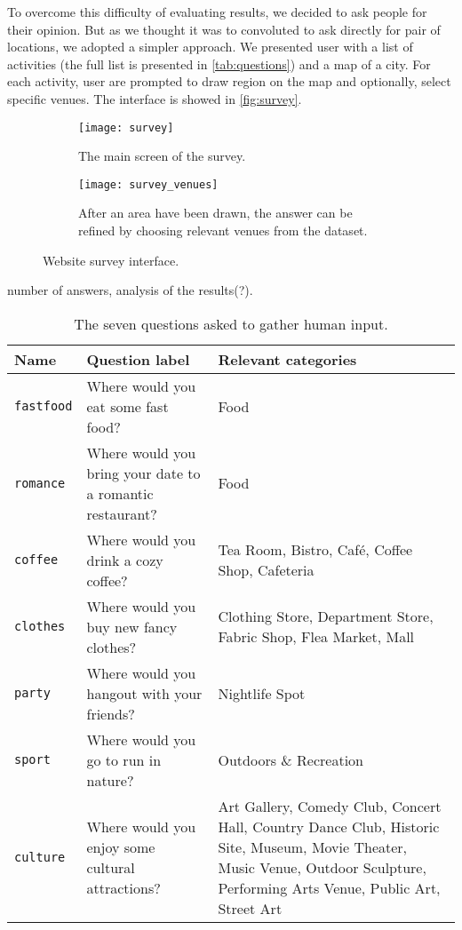To overcome this difficulty of evaluating results, we decided to ask people
for their opinion. But as we thought it was to convoluted to ask directly for
pair of locations, we adopted a simpler approach. We presented user with a
list of activities (the full list is presented in \autoref{tab:questions}) and
a map of a city. For each activity, user are prompted to draw region on the
map and optionally, select specific venues. The interface is showed in
\autoref{fig:survey}.

\begin{figure}[hbtp]
    \centering
    \begin{subfigure}[b]{\textwidth}
        \texttt{[image: survey]}
        \caption{The main screen of the survey.}
    \end{subfigure}

    \begin{subfigure}[b]{\textwidth}
        \texttt{[image: survey\_venues]}
        \caption{After an area have been drawn, the answer can be refined by
        choosing relevant venues from the dataset.}
    \end{subfigure}
    \caption{Website survey interface.\label{fig:survey}}
\end{figure}

number of answers, analysis of the results(?).

\begin{table}[ht]
    \centering
    \begin{tabularx}{\textwidth}{lXX}
        \toprule
	Name & Question label & Relevant categories \\
        \midrule
	\texttt{fastfood} & Where would you eat some fast food?                       & Food \\
	\texttt{romance}  & Where would you bring your date to a romantic restaurant? & Food \\
	\texttt{coffee}   & Where would you drink a cozy coffee?                      & Tea Room, Bistro, Café, Coffee Shop, Cafeteria \\
	\texttt{clothes}  & Where would you buy new fancy clothes?                    & Clothing Store, Department Store, Fabric Shop, Flea Market, Mall \\
	\texttt{party}    & Where would you hangout with your friends?                & Nightlife Spot \\
	\texttt{sport}    & Where would you go to run in nature?                      &  Outdoors \& Recreation \\
	\texttt{culture}  & Where would you enjoy some cultural attractions?          & Art Gallery, Comedy Club, Concert Hall, Country Dance Club, Historic Site, Museum, Movie Theater, Music Venue, Outdoor Sculpture, Performing Arts Venue, Public Art, Street Art \\
        \bottomrule
    \end{tabularx}
    \caption[Question list]{The seven questions asked to gather human
    input.\label{tab:questions}}
\end{table}

